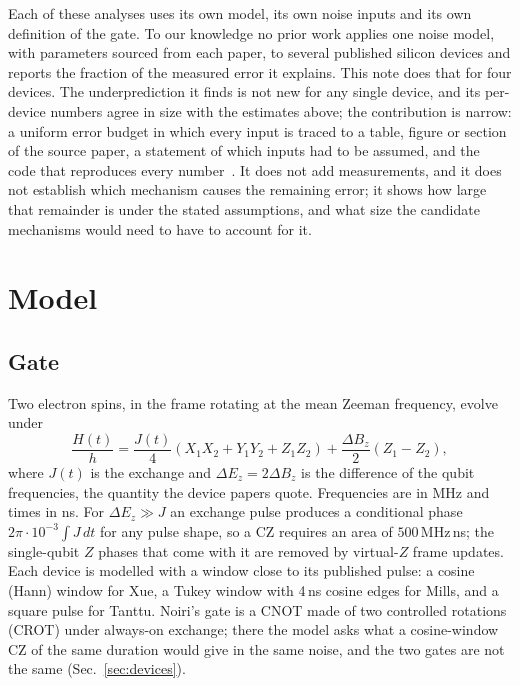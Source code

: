 \documentclass[reprint,aps,pra,floatfix,superscriptaddress,longbibliography,nofootinbib]{revtex4-2}
\newcommand{\dEz}{\Delta E_z}
\begin{document}
Each of these analyses uses its own model, its own noise inputs and its own definition of the gate. To our knowledge no prior work applies one noise model, with parameters sourced from each paper, to several published silicon devices and reports the fraction of the measured error it explains. This note does that for four devices. The underprediction it finds is not new for any single device, and its per-device numbers agree in size with the estimates above; the contribution is narrow: a uniform error budget in which every input is traced to a table, figure or section of the source paper, a statement of which inputs had to be assumed, and the code that reproduces every number~\cite{code}. It does not add measurements, and it does not establish which mechanism causes the remaining error; it shows how large that remainder is under the stated assumptions, and what size the candidate mechanisms would need to have to account for it.

\section{Model}
\label{sec:model}

\subsection{Gate}

Two electron spins, in the frame rotating at the mean Zeeman frequency, evolve under
\begin{equation}
\frac{H(t)}{h} = \frac{J(t)}{4}\left(X_1X_2+Y_1Y_2+Z_1Z_2\right) + \frac{\Delta B_z}{2}\left(Z_1-Z_2\right),
\label{eq:H}
\end{equation}
where $J(t)$ is the exchange and $\dEz = 2\Delta B_z$ is the difference of the qubit frequencies, the quantity the device papers quote. Frequencies are in MHz and times in ns. For $\dEz \gg J$ an exchange pulse produces a conditional phase $2\pi\cdot10^{-3}\int J\,dt$ for any pulse shape, so a CZ requires an area of $500$\,MHz\,ns; the single-qubit $Z$ phases that come with it are removed by virtual-$Z$ frame updates. Each device is modelled with a window close to its published pulse: a cosine (Hann) window for Xue, a Tukey window with 4\,ns cosine edges for Mills, and a square pulse for Tanttu. Noiri's gate is a CNOT made of two controlled rotations (CROT) under always-on exchange; there the model asks what a cosine-window CZ of the same duration would give in the same noise, and the two gates are not the same (Sec.~\ref{sec:devices}).
\end{document}
